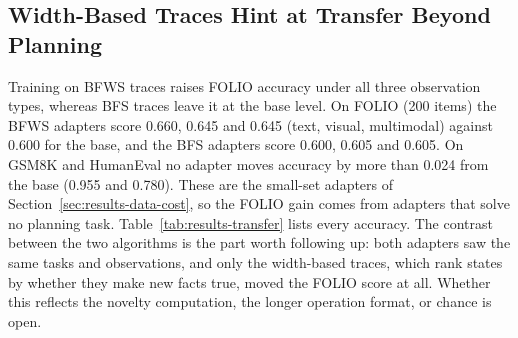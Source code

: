 \subsection{Width-Based Traces Hint at Transfer Beyond Planning}
\label{sec:results-transfer}

Training on BFWS traces raises FOLIO accuracy under all three observation types, whereas BFS traces leave it at the base level. On FOLIO (200 items) the BFWS adapters score 0.660, 0.645 and 0.645 (text, visual, multimodal) against 0.600 for the base, and the BFS adapters score 0.600, 0.605 and 0.605. On GSM8K and HumanEval no adapter moves accuracy by more than 0.024 from the base (0.955 and 0.780). These are the small-set adapters of Section~\ref{sec:results-data-cost}, so the FOLIO gain comes from adapters that solve no planning task. Table~\ref{tab:results-transfer} lists every accuracy. The contrast between the two algorithms is the part worth following up: both adapters saw the same tasks and observations, and only the width-based traces, which rank states by whether they make new facts true, moved the FOLIO score at all. Whether this reflects the novelty computation, the longer operation format, or chance is open.
